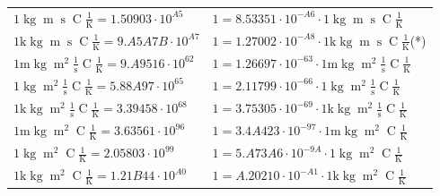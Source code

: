 \begin{center}
\begin{longtable}{l l}
{\color{black}$1 \bm{\mathrm{ }}\operatorname{kg}{\operatorname{m}}{\operatorname{s}}{\operatorname{C}}\frac1{\operatorname{K}} = 1.50903\cdot10^{A5} $}   & {\color{black}$ 1 = 8.53351\cdot10^{-A6} \cdot 1 \bm{\mathrm{ }}\operatorname{kg}{\operatorname{m}}{\operatorname{s}}{\operatorname{C}}\frac1{\operatorname{K}}$}  \\
{\color{gray}$1 \bm{\mathrm{ k}}\operatorname{kg}{\operatorname{m}}{\operatorname{s}}{\operatorname{C}}\frac1{\operatorname{K}} = 9.A5A7B\cdot10^{A7} $}   & {\color{gray}$ 1 = 1.27002\cdot10^{-A8} \cdot 1 \bm{\mathrm{ k}}\operatorname{kg}{\operatorname{m}}{\operatorname{s}}{\operatorname{C}}\frac1{\operatorname{K}}$}\quad(*)\\
{\color{gray}$1 \bm{\mathrm{ m}}\operatorname{kg}{\operatorname{m}^2}\frac1{\operatorname{s}}{\operatorname{C}}\frac1{\operatorname{K}} = 9.A9516\cdot10^{62} $}   & {\color{gray}$ 1 = 1.26697\cdot10^{-63} \cdot 1 \bm{\mathrm{ m}}\operatorname{kg}{\operatorname{m}^2}\frac1{\operatorname{s}}{\operatorname{C}}\frac1{\operatorname{K}}$}  \\
{\color{black}$1 \bm{\mathrm{ }}\operatorname{kg}{\operatorname{m}^2}\frac1{\operatorname{s}}{\operatorname{C}}\frac1{\operatorname{K}} = 5.88A97\cdot10^{65} $}   & {\color{black}$ 1 = 2.11799\cdot10^{-66} \cdot 1 \bm{\mathrm{ }}\operatorname{kg}{\operatorname{m}^2}\frac1{\operatorname{s}}{\operatorname{C}}\frac1{\operatorname{K}}$}  \\
{\color{gray}$1 \bm{\mathrm{ k}}\operatorname{kg}{\operatorname{m}^2}\frac1{\operatorname{s}}{\operatorname{C}}\frac1{\operatorname{K}} = 3.39458\cdot10^{68} $}   & {\color{gray}$ 1 = 3.75305\cdot10^{-69} \cdot 1 \bm{\mathrm{ k}}\operatorname{kg}{\operatorname{m}^2}\frac1{\operatorname{s}}{\operatorname{C}}\frac1{\operatorname{K}}$}  \\
{\color{gray}$1 \bm{\mathrm{ m}}\operatorname{kg}{\operatorname{m}^2}{}{\operatorname{C}}\frac1{\operatorname{K}} = 3.63561\cdot10^{96} $}   & {\color{gray}$ 1 = 3.4A423\cdot10^{-97} \cdot 1 \bm{\mathrm{ m}}\operatorname{kg}{\operatorname{m}^2}{}{\operatorname{C}}\frac1{\operatorname{K}}$}  \\
{\color{black}$1 \bm{\mathrm{ }}\operatorname{kg}{\operatorname{m}^2}{}{\operatorname{C}}\frac1{\operatorname{K}} = 2.05803\cdot10^{99} $}   & {\color{black}$ 1 = 5.A73A6\cdot10^{-9A} \cdot 1 \bm{\mathrm{ }}\operatorname{kg}{\operatorname{m}^2}{}{\operatorname{C}}\frac1{\operatorname{K}}$}  \\
{\color{gray}$1 \bm{\mathrm{ k}}\operatorname{kg}{\operatorname{m}^2}{}{\operatorname{C}}\frac1{\operatorname{K}} = 1.21B44\cdot10^{A0} $}   & {\color{gray}$ 1 = A.20210\cdot10^{-A1} \cdot 1 \bm{\mathrm{ k}}\operatorname{kg}{\operatorname{m}^2}{}{\operatorname{C}}\frac1{\operatorname{K}}$}  \\

\end{longtable}
\end{center}
